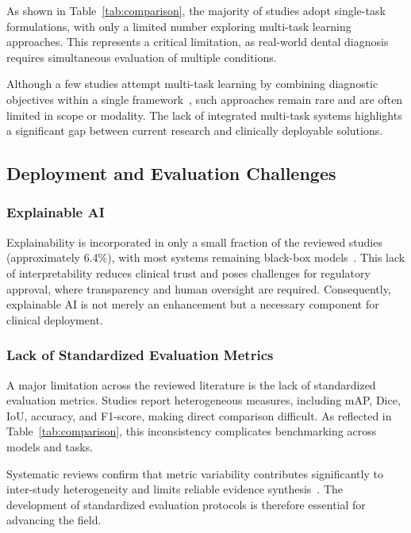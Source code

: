 \documentclass[conference]{IEEEtran}
\begin{document}
As shown in Table~\ref{tab:comparison}, the majority of studies adopt single-task formulations, with only a limited number exploring multi-task learning approaches. This represents a critical limitation, as real-world dental diagnosis requires simultaneous evaluation of multiple conditions.

Although a few studies attempt multi-task learning by combining diagnostic objectives within a single framework~\cite{chen2023deep}, such approaches remain rare and are often limited in scope or modality. The lack of integrated multi-task systems highlights a significant gap between current research and clinically deployable solutions.

\subsection{Deployment and Evaluation Challenges}

\subsubsection{Explainable AI}

Explainability is incorporated in only a small fraction of the reviewed studies (approximately 6.4\%), with most systems remaining black-box models~\cite{chen2023deep}. This lack of interpretability reduces clinical trust and poses challenges for regulatory approval, where transparency and human oversight are required. Consequently, explainable AI is not merely an enhancement but a necessary component for clinical deployment.

\subsubsection{Lack of Standardized Evaluation Metrics}

A major limitation across the reviewed literature is the lack of standardized evaluation metrics. Studies report heterogeneous measures, including mAP, Dice, IoU, accuracy, and F1-score, making direct comparison difficult. As reflected in Table~\ref{tab:comparison}, this inconsistency complicates benchmarking across models and tasks.

Systematic reviews confirm that metric variability contributes significantly to inter-study heterogeneity and limits reliable evidence synthesis~\cite{bonfanti2025deep}. The development of standardized evaluation protocols is therefore essential for advancing the field.
\end{document}

